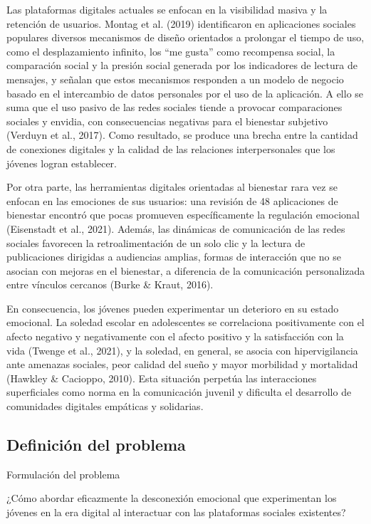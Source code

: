 Las plataformas digitales actuales se enfocan en la visibilidad masiva y la retención de usuarios. Montag et al. (2019) identificaron en aplicaciones sociales populares diversos mecanismos de diseño orientados a prolongar el tiempo de uso, como el desplazamiento infinito, los ``me gusta'' como recompensa social, la comparación social y la presión social generada por los indicadores de lectura de mensajes, y señalan que estos mecanismos responden a un modelo de negocio basado en el intercambio de datos personales por el uso de la aplicación. A ello se suma que el uso pasivo de las redes sociales tiende a provocar comparaciones sociales y envidia, con consecuencias negativas para el bienestar subjetivo (Verduyn et al., 2017). Como resultado, se produce una brecha entre la cantidad de conexiones digitales y la calidad de las relaciones interpersonales que los jóvenes logran establecer.

Por otra parte, las herramientas digitales orientadas al bienestar rara vez se enfocan en las emociones de sus usuarios: una revisión de 48 aplicaciones de bienestar encontró que pocas promueven específicamente la regulación emocional (Eisenstadt et al., 2021). Además, las dinámicas de comunicación de las redes sociales favorecen la retroalimentación de un solo clic y la lectura de publicaciones dirigidas a audiencias amplias, formas de interacción que no se asocian con mejoras en el bienestar, a diferencia de la comunicación personalizada entre vínculos cercanos (Burke \& Kraut, 2016).

En consecuencia, los jóvenes pueden experimentar un deterioro en su estado emocional. La soledad escolar en adolescentes se correlaciona positivamente con el afecto negativo y negativamente con el afecto positivo y la satisfacción con la vida (Twenge et al., 2021), y la soledad, en general, se asocia con hipervigilancia ante amenazas sociales, peor calidad del sueño y mayor morbilidad y mortalidad (Hawkley \& Cacioppo, 2010). Esta situación perpetúa las interacciones superficiales como norma en la comunicación juvenil y dificulta el desarrollo de comunidades digitales empáticas y solidarias.

\subsection{Definición del problema}
Formulación del problema

¿Cómo abordar eficazmente la desconexión emocional que experimentan los jóvenes en la era digital al interactuar con las plataformas sociales existentes?

